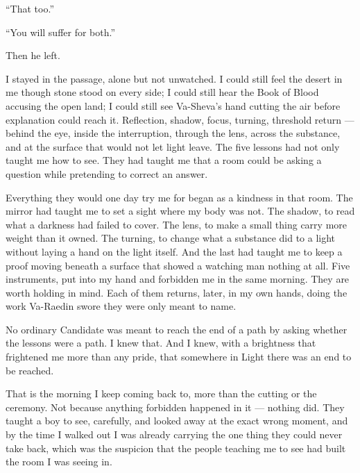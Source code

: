 ``That too.''\par

``You will suffer for both.''\par

Then he left.\par

\ornament

I stayed in the passage, alone but not unwatched. I could still feel the desert in me though stone stood on every side; I could still hear the Book of Blood accusing the open land; I could still see Va-Sheva's hand cutting the air before explanation could reach it. Reflection, shadow, focus, turning, threshold return --- behind the eye, inside the interruption, through the lens, across the substance, and at the surface that would not let light leave. The five lessons had not only taught me how to see. They had taught me that a room could be asking a question while pretending to correct an answer.\par

Everything they would one day try me for began as a kindness in that room. The mirror had taught me to set a sight where my body was not. The shadow, to read what a darkness had failed to cover. The lens, to make a small thing carry more weight than it owned. The turning, to change what a substance did to a light without laying a hand on the light itself. And the last had taught me to keep a proof moving beneath a surface that showed a watching man nothing at all. Five instruments, put into my hand and forbidden me in the same morning. They are worth holding in mind. Each of them returns, later, in my own hands, doing the work Va-Raedin swore they were only meant to name.\par

No ordinary Candidate was meant to reach the end of a path by asking whether the lessons were a path. I knew that. And I knew, with a brightness that frightened me more than any pride, that somewhere in Light there was an end to be reached.\par

That is the morning I keep coming back to, more than the cutting or the ceremony. Not because anything forbidden happened in it --- nothing did. They taught a boy to see, carefully, and looked away at the exact wrong moment, and by the time I walked out I was already carrying the one thing they could never take back, which was the suspicion that the people teaching me to see had built the room I was seeing in.\par

